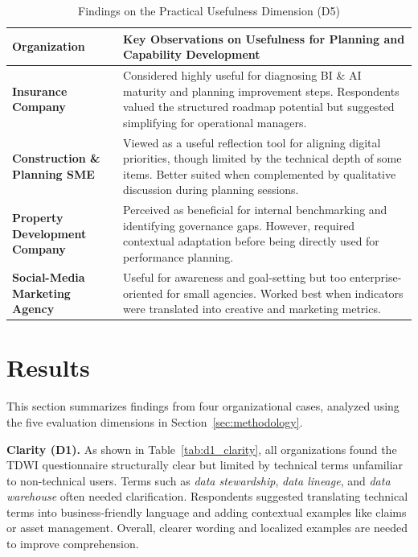 \documentclass[conference]{IEEEtran}
\begin{document}
\begin{table}[t]
\centering
\caption{Findings on the Practical Usefulness Dimension (D5)}
\label{tab:d5_usefulness}
\renewcommand{\arraystretch}{1.2}
\begin{tabular}{p{.16\linewidth} p{.74\linewidth}}
\hline
\textbf{Organization} & \textbf{Key Observations on Usefulness for Planning and Capability Development} \\ \hline

\textbf{Insurance Company} & 
Considered highly useful for diagnosing BI \& AI maturity and planning improvement steps.  
Respondents valued the structured roadmap potential but suggested simplifying for operational managers. \\ \hline

\textbf{Construction \& Planning SME} & 
Viewed as a useful reflection tool for aligning digital priorities, though limited by the technical depth of some items.  
Better suited when complemented by qualitative discussion during planning sessions. \\ \hline

\textbf{Property Development Company} & 
Perceived as beneficial for internal benchmarking and identifying governance gaps.  
However, required contextual adaptation before being directly used for performance planning. \\ \hline

\textbf{Social-Media Marketing Agency} & 
Useful for awareness and goal-setting but too enterprise-oriented for small agencies.  
Worked best when indicators were translated into creative and marketing metrics. \\ \hline
\end{tabular}
\end{table}

\section{Results}
\label{sec:results}

This section summarizes findings from four organizational cases, analyzed using the five evaluation dimensions in Section~\ref{sec:methodology}.

\textbf{Clarity (D1).}  
As shown in Table~\ref{tab:d1_clarity}, all organizations found the TDWI questionnaire structurally clear but limited by technical terms unfamiliar to non-technical users.  
Terms such as \emph{data stewardship}, \emph{data lineage}, and \emph{data warehouse} often needed clarification.  
Respondents suggested translating technical terms into business-friendly language and adding contextual examples like claims or asset management.  
Overall, clearer wording and localized examples are needed to improve comprehension.
\end{document}
